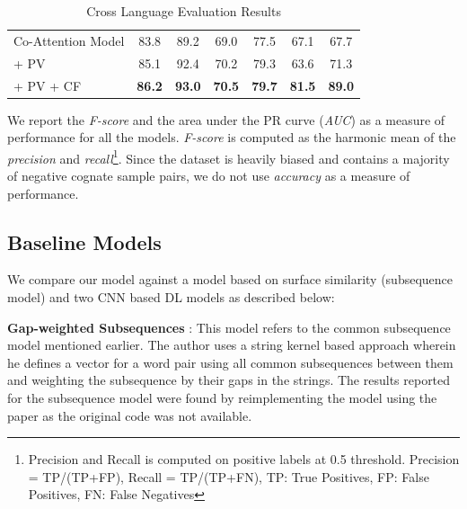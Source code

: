 \documentclass[11pt,letterpaper]{article}
\begin{document}
\begin{table}[t]
\begin{tabular}{lcccccc}
Co-Attention Model                                  & 83.8                                 & 89.2                             & 69.0                  & 77.5              & 67.1              & 67.7           \\
\quad + PV                                                & 85.1                                 & 92.4                             & 70.2                  & 79.3              & 63.6              & 71.3           \\
\quad + PV + CF                                           & \textbf{86.2}                        & \textbf{93.0}                    & \textbf{70.5}         & \textbf{79.7}     & \textbf{81.5}              & \textbf{89.0}
\end{tabular}
\caption{Cross Language Evaluation Results }
\label{CL_res}
\end{table}

We report the \textit{F-score} and the area under the PR curve (\textit{AUC}) as a measure of performance for all the models. \textit{F-score} is computed as the harmonic mean of the \textit{precision} and \textit{recall}\footnote{Precision and Recall is computed on positive labels at 0.5 threshold. Precision = TP/(TP+FP), Recall = TP/(TP+FN), TP: True Positives, FP: False Positives, FN: False Negatives}. Since the dataset is heavily biased and contains a majority of negative cognate sample pairs, we do not use \textit{accuracy} as a measure of performance.

\subsection{Baseline Models}

We compare our model against a model based on surface similarity (subsequence model) and two CNN based DL models as described below:

\textbf{Gap-weighted Subsequences} : This model refers to the common subsequence model \cite{rama2015automatic} mentioned earlier. The author uses a string kernel based approach wherein he defines a vector for a word pair using all common subsequences between them and weighting the subsequence by their gaps in the strings. The results reported for the subsequence model were found by reimplementing the model using the paper as the original code was not available.
\end{document}
